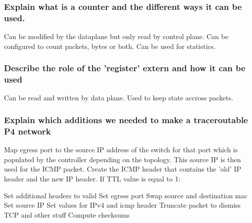 \documentclass[a4paper, fontsize=8pt, landscape, DIV=1]{scrartcl}
\begin{document}
\begin{multicols*}{4}
  \subsubsection{Explain what is a counter and the different ways it can be used.}
  Can be modified by the dataplane but only read by control plane. Can be configured to
  count packets, bytes or both. Can be used for statistics.

  \subsubsection{Describe the role of the 'register' extern and how it can be used}
  Can be read and written by data plane. Used to keep state accross packets.

  \subsubsection{Explain which additions we needed to make a traceroutable P4 network}
  Map egress port to the source IP address of the switch for that port which is populated 
  by the controller depending on the topology. This source IP is then used for the ICMP
  packet. Create the ICMP header that contains the 'old' IP header and the new IP header.
  If TTL value is equal to 1:
  \begin{outline}
  \1 Set additional headers to valid
  \1 Set egress port
  \1 Swap source and destination mac
  \1 Set source IP
  \1 Set values for IPv4 and icmp header
  \1 Truncate packet to dismiss TCP and other stuff
  \1 Compute checksums
  \end{outline}



  \vfill\null
  \pagebreak
  \end{multicols*}
\end{document}
